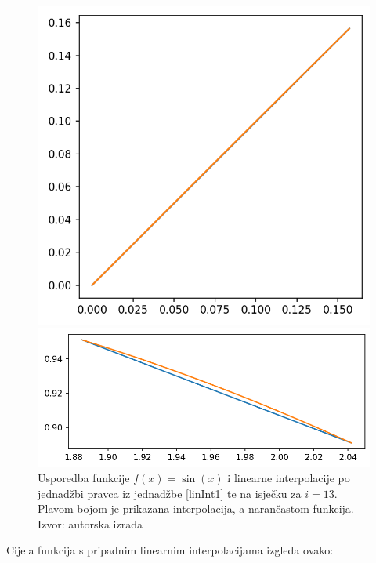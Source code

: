 \documentclass[12pt,a4paper]{report}
\begin{document}
			\begin{figure}[H]
				\centering
				\begin{minipage}{.5\textwidth}
					\centering
					\includegraphics[width=\textwidth]{slike/usporedba40.png}
				\end{minipage}%
				\begin{minipage}{.5\textwidth}
					\centering
					\includegraphics[width=\textwidth]{slike/usporedba412.png}
				\end{minipage}
				\caption{Usporedba funkcije $f(x)=\sin (x)$ i linearne interpolacije po jednadžbi pravca iz jednadžbe \ref{linInt1} te na isječku za $i=13$. Plavom bojom je prikazana interpolacija, a narančastom funkcija. Izvor: autorska izrada}
				\label{linInterSlika1}
			\end{figure}
			Cijela funkcija s pripadnim linearnim interpolacijama izgleda ovako:
\end{document}
